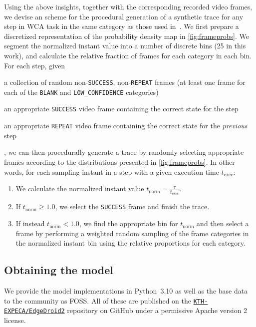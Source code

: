 Using the above insights, together with the corresponding recorded video frames, we devise an scheme for the procedural generation of a synthetic trace for any step in \ac{WCA} task in the same category as those used in~\cite{olguinmunoz:impact2021}.
We first prepare a discretized representation of the probability density map in \cref{fig:frameprobs}.
We segment the normalized instant value into a number of discrete bins (\num{25} in this work), and calculate the relative fraction of frames for each category in each bin.
For each step, given
\begin{enumerate*}[itemjoin={{; }}, itemjoin*={{; and }}]
    \item a collection of random non-\texttt{SUCCESS}, non-\texttt{REPEAT} frames (at least one frame for each of the \texttt{BLANK} and \texttt{LOW\_CONFIDENCE} categories)
    \item an appropriate \texttt{SUCCESS} video frame containing the correct state for the step
    \item an appropriate \texttt{REPEAT} video frame containing the correct state for the \emph{previous} step
\end{enumerate*},
we can then procedurally generate a trace by randomly selecting appropriate frames according to the distributions presented in \cref{fig:frameprobs}.
In other words, for each sampling instant in a step with a given execution time \( t_\text{exec} \):
\begin{enumerate}
    \item We calculate the normalized instant value \( t_\text{norm} = \frac{\tau}{t_\text{exec}} \).
    \item If \( t_\text{norm} \ge 1.0 \), we select the \texttt{SUCCESS} frame and finish the trace.
    \item If instead \( t_\text{norm} < 1.0 \), we find the appropriate bin for \( t_\text{norm} \) and then select a frame by performing a weighted random sampling of the frame categories in the normalized instant bin using the relative proportions for each category.
\end{enumerate}

\subsection{Obtaining the model}\label{ssec:model:obtaining}

We provide the model implementations in Python~\num{3.10} as well as the base data to the community as \ac{FOSS}.
All of these are published on the \href{https://github.com/KTH-EXPECA/EdgeDroid2}{\texttt{KTH-EXPECA/EdgeDroid2}} repository on GitHub under a permissive Apache version 2 license.